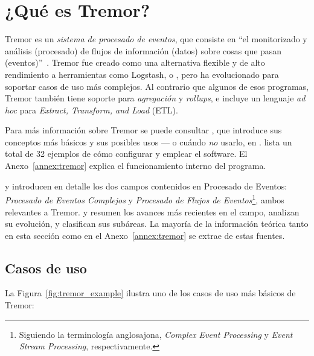 \section{¿Qué es Tremor?}\label{sec:tremor}

Tremor es un \emph{sistema de procesado de eventos}, que consiste en ``el
monitorizado y análisis (procesado) de flujos de información (datos) sobre cosas
que pasan (eventos)''~\cite{luckham2011event}. Tremor fue creado como una
alternativa flexible y de alto rendimiento a herramientas como Logstash,
 o , pero ha evolucionado para soportar casos
de uso más complejos. Al contrario que algunos de esos programas, Tremor también
tiene soporte para \emph{agregación} y \emph{rollups}, e incluye un lenguaje
\emph{ad hoc} para \emph{Extract, Transform, and Load} (ETL).

Para más información sobre Tremor se puede consultar , que
introduce sus conceptos más básicos y sus posibles usos --- o cuándo \emph{no}
usarlo, en .  lista un total
de 32 ejemplos de cómo configurar y emplear el software. El
Anexo~\ref{annex:tremor} explica el funcionamiento interno del programa.

\textcite{robins2010complex} y \textcite{cugola2012processing} introducen en
detalle los dos campos contenidos en Procesado de Eventos: \emph{Procesado de
Eventos Complejos} y \emph{Procesado de Flujos de
Eventos}\footnote{Siguiendo la terminología anglosajona, \emph{Complex Event
Processing} y \emph{Event Stream Processing}, respectivamente.}, ambos
relevantes a Tremor. \textcite{dayarathna2018recent} y
\textcite{tawsif2018review} resumen los avances más recientes en el campo,
analizan su evolución, y clasifican sus subáreas. La mayoría de la información
teórica tanto en esta sección como en el Anexo~\ref{annex:tremor} se extrae de
estas fuentes.

\subsection{Casos de uso}

La Figura~\ref{fig:tremor_example} ilustra uno de los casos de uso más básicos
de Tremor:

